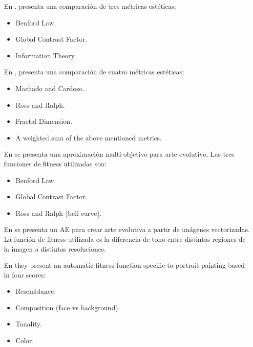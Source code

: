 \documentclass{llncs}
\begin{document}
En \cite{den2010using}, presenta una comparación de tres métricas estéticas:
\begin{itemize}
	\item Benford Law.
	\item Global Contrast Factor.
	\item Information Theory.
\end{itemize}

En \cite{den2010comparing}, presenta una comparación de cuatro métricas estéticas:
\begin{itemize}
	\item Machado and Cardoso.
	\item Ross and Ralph.
	\item Fractal Dimension.
	\item A weighted sum of the above mentioned metrics.
\end{itemize}

En \cite{den2011evolving} se presenta una aproximación multi-objetivo para arte evolutivo. Las tres funciones de fitness utilizadas son:
\begin{itemize}
	\item Benford Law.
	\item Global Contrast Factor.
	\item Ross and Ralph (bell curve).
\end{itemize}


En \cite{den2012evolving} se presenta un AE para crear arte evolutiva a partir de imágenes vectorizadas. La función de fitness utilizada es la diferencia de tono entre  distintas regiones de la imagen a distintas resoluciones.

En \cite{dipaola2009incorporating} they present an automatic fitness function specific to portrait painting based in four scores:
\begin{itemize}
	\item Resemblance.
	\item Composition (face vs background).
	\item Tonality.
	\item Color.
\end{itemize}





\end{document}
